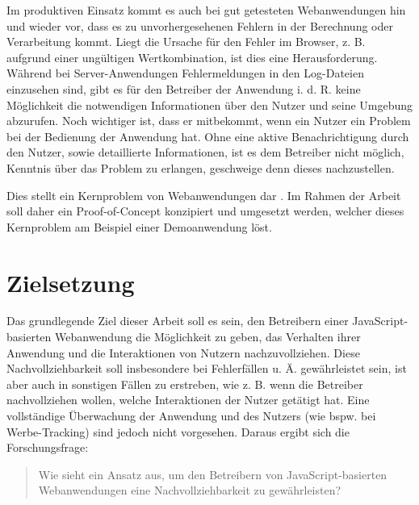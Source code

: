 Im produktiven Einsatz kommt es auch bei gut getesteten Webanwendungen hin und wieder vor, dass es zu unvorhergesehenen Fehlern in der Berechnung oder Verarbeitung kommt. Liegt die Ursache für den Fehler im Browser, z. B. aufgrund einer ungültigen Wertkombination, ist dies eine Herausforderung. Während bei Server-Anwendungen Fehlermeldungen in den Log-Dateien einzusehen sind, gibt es für den Betreiber der Anwendung i. d. R. keine Möglichkeit die notwendigen Informationen über den Nutzer und seine Umgebung abzurufen. Noch wichtiger ist, dass er mitbekommt, wenn ein Nutzer ein Problem bei der Bedienung der Anwendung hat. Ohne eine aktive Benachrichtigung durch den Nutzer, sowie detaillierte Informationen, ist es dem Betreiber nicht möglich, Kenntnis über das Problem zu erlangen, geschweige denn dieses nachzustellen.

Dies stellt ein Kernproblem von  Webanwendungen dar \cite{ClientSideMonitoringOfDistributedSystems}. Im Rahmen der Arbeit soll daher ein Proof-of-Concept konzipiert und umgesetzt werden, welcher dieses Kernproblem am Beispiel einer Demoanwendung löst.

\section{Zielsetzung}

Das grundlegende Ziel dieser Arbeit soll es sein, den Betreibern einer JavaScript-basierten Webanwendung die Möglichkeit zu geben, das Verhalten ihrer Anwendung und die Interaktionen von Nutzern nachzuvollziehen. Diese Nachvollziehbarkeit soll insbesondere bei Fehlerfällen u. Ä. gewährleistet sein, ist aber auch in sonstigen Fällen zu erstreben, wie z. B. wenn die Betreiber nachvollziehen wollen, welche Interaktionen der Nutzer getätigt hat. Eine vollständige Überwachung der Anwendung und des Nutzers (wie bspw. bei Werbe-Tracking) sind jedoch nicht vorgesehen. Daraus ergibt sich die Forschungsfrage:

\begin{quotation}
	Wie sieht ein Ansatz aus, um den Betreibern von JavaScript-basierten Webanwendungen eine Nachvollziehbarkeit zu gewährleisten?
\end{quotation}

